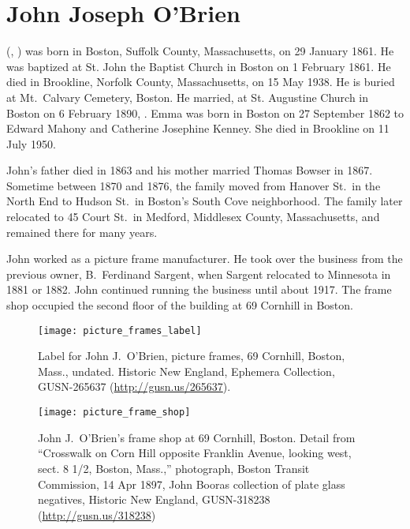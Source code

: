\section{John Joseph O'Brien}

 (, ) was born in Boston, Suffolk County, Massachusetts, on 29 January 1861.\cite{John3OBrienBirth} He was baptized at St. John the Baptist Church in Boston on 1 February 1861.\cite{John3OBrienBaptism} He died in Brookline, Norfolk County, Massachusetts, on 15 May 1938.\cite{John3OBrienDeath} He is buried at Mt.\ Calvary Cemetery, Boston.\cite{John3OBrienBurial} He married, at St. Augustine Church in Boston on 6 February 1890, .\cite{John3OBrienMarriage,John3OBrienMarriage2} Emma was born in Boston on 27 September 1862 to Edward Mahony and Catherine Josephine Kenney.\cite{EmmaMahonyBaptism} She died in Brookline on 11 July 1950.\cite{EmmaMahonyDeath}

John's father died in 1863\cite{John2OBrienDeath} and his mother married Thomas Bowser in 1867.\cite{MaryMahoneyBowserMarriage} Sometime between 1870 and 1876, the family moved from Hanover St.\ in the North End to Hudson St.\ in Boston's South Cove neighborhood.\cite{ThomasBowser1870,ThomasBowser1876} The family later relocated to 45 Court St.\ in Medford, Middlesex County, Massachusetts, and remained there for many years.\cite{Census1910John3OBrien,Census1930John3OBrien}

John worked as a picture frame manufacturer.  He took over the business from the previous owner, B.\ Ferdinand Sargent, when Sargent relocated to Minnesota in 1881 or 1882.\cite{PictureFrameLabel, Sargent} John continued running the business until about 1917.\cite{John3OBrien1916} The frame shop occupied the second floor of the building at 69 Cornhill in Boston.\cite{John3OBrien1916,FrameShopFire} 

\begin{figure}
\centering
\texttt{[image: picture\_frames\_label]}
\caption{Label for John J.\ O'Brien, picture frames, 69 Cornhill, Boston, Mass., undated. Historic New England, Ephemera Collection, GUSN-265637 (\url{http://gusn.us/265637}).}
\end{figure}

\begin{figure}
	\centering
	\texttt{[image: picture\_frame\_shop]}
	\caption{John J.\ O'Brien's frame shop at 69 Cornhill, Boston. Detail from ``Crosswalk on Corn Hill opposite Franklin Avenue, looking west, sect. 8 1/2, Boston, Mass.,'' photograph, Boston Transit Commission, 14 Apr 1897, John Booras collection of plate glass negatives, Historic New England, GUSN-318238 (\url{http://gusn.us/318238}) }
\end{figure}

